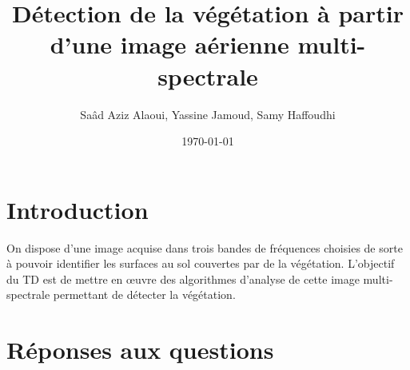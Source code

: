 \documentclass[12pt,a4paper,titlepage]{article}
\title{Détection de la végétation à partir d'une image aérienne multi-spectrale}
\author{Saâd Aziz Alaoui, Yassine Jamoud, Samy Haffoudhi}
\date{\today}
\begin{document}
\maketitle

\section*{Introduction}

On dispose d'une image acquise dans trois bandes de fréquences choisies de sorte à pouvoir
identifier les surfaces au sol couvertes par de la végétation. L'objectif du TD est de
mettre en œuvre des algorithmes d'analyse de cette image multi-spectrale permettant de
détecter la végétation.

\section{Réponses aux questions}
\end{document}
